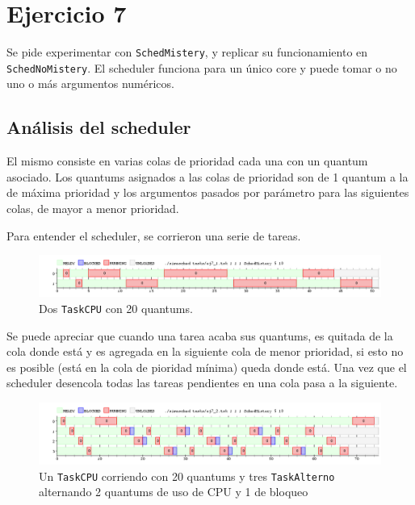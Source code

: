 \section{Ejercicio 7}
	Se pide experimentar con \texttt{SchedMistery}, y replicar su funcionamiento
	en \texttt{SchedNoMistery}.
	El scheduler funciona para un único core y puede tomar o no uno o más argumentos numéricos.

	\subsection{Análisis del scheduler}

	El mismo consiste en varias colas de prioridad cada una con un quantum
	asociado. Los quantums asignados a las colas de prioridad son de 1 quantum a la
	de máxima prioridad y los argumentos pasados por parámetro para las
	siguientes colas, de mayor a menor prioridad.

	Para entender el scheduler, se corrieron una serie de tareas.

	\begin{figure}[H]
		\begin{center}
			\includegraphics[width=1\columnwidth]{imagenes/ej7_1.png}
			\caption{Dos \texttt{TaskCPU} con 20 quantums.}
		\end{center}
	\end{figure}

	Se puede apreciar que cuando una tarea acaba sus quantums, es quitada de la
	cola donde está y es agregada en la siguiente cola de menor
	prioridad, si esto no es posible (está en la cola de pioridad mínima) queda
	donde está. Una vez que el scheduler desencola todas las tareas pendientes en una cola pasa a la siguiente.


	\begin{figure}[H]
		\begin{center}
			\includegraphics[width=1\columnwidth]{imagenes/ej7_2.png}
			\caption{Un \texttt{TaskCPU} corriendo con 20 quantums y tres
			\texttt{TaskAlterno} alternando 2 quantums de uso de CPU y 1 de bloqueo}
		\end{center}
	\end{figure}

